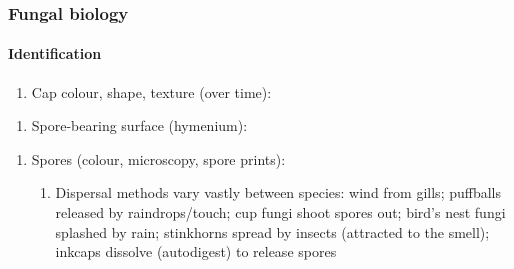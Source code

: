 \subsubsection{Fungal biology}
\paragraph{Identification}\mbox{}

\begin{center}\end{center}

\begin{enumerate}
  \item Cap colour, shape, texture (over time):
\end{enumerate}
\begin{imagerow}
   \hfill
   \hfill
\end{imagerow}

\begin{enumerate}[resume]
  \item Spore-bearing surface (hymenium):
\end{enumerate}
\begin{imagerow}
   \hfill
   \hfill
\end{imagerow}

\begin{enumerate}[resume]
  \item Spores (colour, microscopy, spore prints):
  \begin{enumerate}[label=\alph*.]
    \item Dispersal methods vary vastly between species: wind from gills; puffballs released by raindrops/touch; cup fungi shoot spores out; bird's nest fungi splashed by rain; stinkhorns spread by insects (attracted to the smell); inkcaps dissolve (autodigest) to release spores
  \end{enumerate}
\end{enumerate}
\begin{imagerow}
   \hfill
   \hfill
\end{imagerow}

